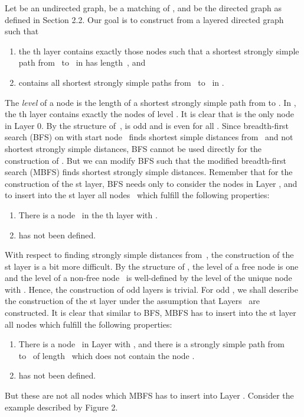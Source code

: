 \documentclass[12pt,twoside,a4paper]{article}
\begin{document}
Let  be an undirected graph,  be a matching of , and 
 be the directed graph as defined in Section 2.2.
Our goal is to construct from  a layered directed graph
 such that
\begin{enumerate}
\item the th layer contains exactly those nodes  such that a
      shortest strongly simple path from~ to~ in  has length~, and
\item  contains all shortest strongly simple paths from~ to~ 
      in .
\end{enumerate}
The {\em level} of a node  is the length of a shortest strongly simple path 
from  to . In , the th layer contains exactly the nodes of level
. It is clear that  is the only node in Layer 0. 
By the structure of~,  is odd and  is even for all 
. Since breadth-first search (BFS) on  with start node~ finds shortest 
simple distances from~ and not shortest strongly simple distances, BFS cannot be
used directly for the construction of . But we can modify BFS 
such that the modified breadth-first search (MBFS) finds shortest strongly 
simple distances.
Remember that for the construction of the st layer, BFS needs only
to consider the nodes in Layer , and to insert into the st layer 
all nodes~  which fulfill the following properties:
\begin{enumerate}
\item There is a node~ in the th layer with .
\item  has not been defined.
\end{enumerate}
With respect to finding strongly simple distances from~, the construction of
the st layer is a bit more difficult.
By the structure of , the level of a free node  is one and
the level of a non-free node~ is
well-defined by the level of the unique node~ with
. Hence, the construction of odd layers is trivial.
For odd , we shall describe the construction of the st layer under 
the assumption that Layers~ are constructed.
It is clear that similar to BFS, MBFS has to insert into the st layer 
all nodes  which fulfill the following properties:
\begin{enumerate}
\item There is a node~ in Layer  with , and there is a strongly simple path
        from~ to~ of length~ which does not contain the node .
\item  has not been defined.
\end{enumerate}
But these are not all nodes which MBFS has to insert into Layer .
Consider the example described by Figure 2.
\end{document}
